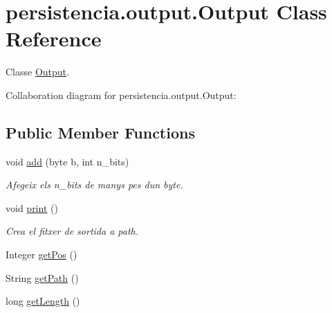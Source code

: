 \hypertarget{classpersistencia_1_1output_1_1Output}{}\section{persistencia.\+output.\+Output Class Reference}
\label{classpersistencia_1_1output_1_1Output}


Classe \hyperlink{classpersistencia_1_1output_1_1Output}{Output}.  




Collaboration diagram for persistencia.\+output.\+Output\+:
\subsection*{Public Member Functions}
\begin{DoxyCompactItemize}
\item 
void \hyperlink{classpersistencia_1_1output_1_1Output_adc03a0dd7a94da21fe8432064a4eec09}{add} (byte b, int n\+\_\+bits)
\begin{DoxyCompactList}\small\item\em Afegeix els n\+\_\+bits de manys pes d\textquotesingle{}un byte. \end{DoxyCompactList}\item 
void \hyperlink{classpersistencia_1_1output_1_1Output_a416850e57f55bd371d60b2aae8e7e983}{print} ()
\begin{DoxyCompactList}\small\item\em Crea el fitxer de sortida a path. \end{DoxyCompactList}\item 
Integer \hyperlink{classpersistencia_1_1output_1_1Output_a01f862217e01efb59bc2eff3fe54006f}{get\+Pos} ()
\item 
String \hyperlink{classpersistencia_1_1output_1_1Output_ae33fc52334f791b6d4d7aebf2931df8d}{get\+Path} ()
\item 
long \hyperlink{classpersistencia_1_1output_1_1Output_a646d510d52039785f485d42e675cdfee}{get\+Length} ()
\end{DoxyCompactItemize}
